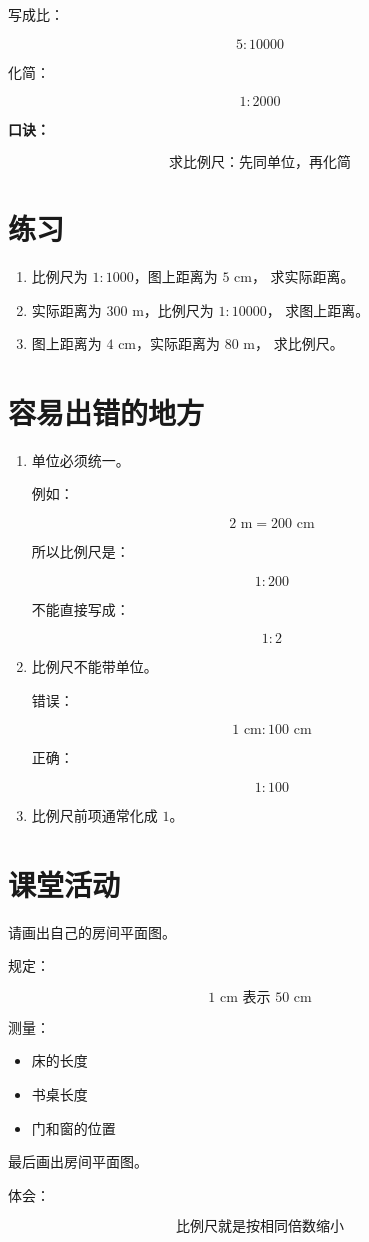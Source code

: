 \documentclass[DIN, pagenumber=false, fontsize=11pt, parskip=half]{scrartcl}
\begin{document}
写成比：

\[
5:10000
\]

化简：

\[
1:2000
\]

\textbf{口诀：}

\[
\boxed{\text{求比例尺：先同单位，再化简}}
\]

\section{练习}

\begin{enumerate}
    \item 比例尺为 $1:1000$，图上距离为 $5$ cm，
    求实际距离。

    \item 实际距离为 $300$ m，比例尺为 $1:10000$，
    求图上距离。

    \item 图上距离为 $4$ cm，实际距离为 $80$ m，
    求比例尺。
\end{enumerate}

\section{容易出错的地方}

\begin{enumerate}
    \item 单位必须统一。

    例如：

    \[
    2\text{ m}=200\text{ cm}
    \]

    所以比例尺是：

    \[
    1:200
    \]

    不能直接写成：

    \[
    1:2
    \]

    \item 比例尺不能带单位。

    错误：

    \[
    1\text{ cm}:100\text{ cm}
    \]

    正确：

    \[
    1:100
    \]

    \item 比例尺前项通常化成 $1$。
\end{enumerate}

\section{课堂活动}

请画出自己的房间平面图。

规定：

\[
1\text{ cm 表示 }50\text{ cm}
\]

测量：

\begin{itemize}
    \item 床的长度
    \item 书桌长度
    \item 门和窗的位置
\end{itemize}

最后画出房间平面图。

体会：

\[
\boxed{\text{比例尺就是按相同倍数缩小}}
\]
\end{document}
